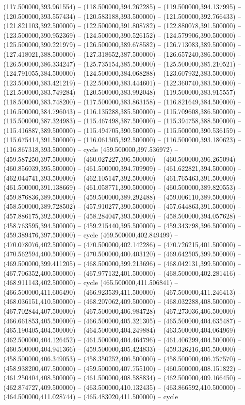    (117.500000,393.961554) -- (118.500000,394.262285) -- (119.500000,394.137995) -- (120.500000,393.557434) -- (120.583188,393.500000) -- (121.500000,392.766433) -- (121.821103,392.500000) -- (122.500000,391.808782) -- (122.880078,391.500000) -- (123.500000,390.952369) -- (124.500000,390.526152) -- (124.579906,390.500000) -- (125.500000,390.221979) -- (126.500000,389.678582) -- (126.713083,389.500000) -- (127.418021,388.500000) -- (127.318652,387.500000) -- (126.657240,386.500000) -- (126.500000,386.334247) -- (125.735154,385.500000) -- (125.500000,385.210521) -- (124.791055,384.500000) -- (124.500000,384.068288) -- (123.607932,383.500000) -- (123.500000,383.421219) -- (122.500000,383.444601) -- (122.360740,383.500000) -- (121.500000,383.749284) -- (120.500000,383.992048) -- (119.500000,383.915557) -- (118.500000,383.748200) -- (117.500000,383.863158) -- (116.821649,384.500000) -- (116.500000,384.796043) -- (116.135288,385.500000) -- (115.709608,386.500000) -- (115.500000,387.324983) -- (115.467498,387.500000) -- (115.394758,388.500000) -- (115.416887,389.500000) -- (115.494705,390.500000) -- (115.500000,390.536159) -- (115.675414,391.500000) -- (116.061305,392.500000) -- (116.500000,393.180623) -- (116.867318,393.500000) -- cycle
   (459.500000,397.536972) -- (459.587250,397.500000) -- (460.027227,396.500000) -- (460.500000,396.265094) -- (460.856039,395.500000) -- (461.500000,394.709909) -- (461.622821,394.500000) -- (462.044741,393.500000) -- (462.105147,392.500000) -- (461.765463,391.500000) -- (461.500000,391.138669) -- (461.058771,390.500000) -- (460.500000,389.820553) -- (459.876836,389.500000) -- (459.500000,389.292488) -- (459.006110,389.500000) -- (458.500000,389.728502) -- (457.910277,390.500000) -- (457.644863,391.500000) -- (457.886175,392.500000) -- (458.284047,393.500000) -- (458.500000,394.057628) -- (458.763595,394.500000) -- (459.215440,395.500000) -- (459.343798,396.500000) -- (459.389476,397.500000) -- cycle
   (469.500000,402.849499) -- (470.078076,402.500000) -- (470.500000,402.142286) -- (470.726215,401.500000) -- (470.562594,400.500000) -- (470.500000,400.403120) -- (469.642505,399.500000) -- (469.500000,399.411205) -- (468.500000,399.213696) -- (468.042131,399.500000) -- (467.706352,400.500000) -- (467.977132,401.500000) -- (468.500000,402.281416) -- (468.911143,402.500000) -- cycle
   (465.500000,411.506841) -- (466.500000,411.606490) -- (466.923539,411.500000) -- (467.500000,411.246413) -- (468.036151,410.500000) -- (468.207062,409.500000) -- (468.032288,408.500000) -- (467.702844,407.500000) -- (467.500000,406.984728) -- (467.273036,406.500000) -- (466.661853,405.500000) -- (466.500000,405.321305) -- (465.500000,404.635487) -- (465.190405,404.500000) -- (464.500000,404.249884) -- (463.500000,404.064969) -- (462.500000,404.126452) -- (461.500000,404.464796) -- (461.406299,404.500000) -- (460.500000,404.941366) -- (459.500000,405.424833) -- (459.326216,405.500000) -- (458.500000,406.349053) -- (458.350252,406.500000) -- (458.500000,406.757570) -- (458.938200,407.500000) -- (459.500000,407.755100) -- (460.500000,408.151822) -- (461.250404,408.500000) -- (461.500000,408.588834) -- (462.500000,409.166450) -- (462.874727,409.500000) -- (463.500000,410.132435) -- (463.866592,410.500000) -- (464.500000,411.028744) -- (465.483020,411.500000) -- cycle
